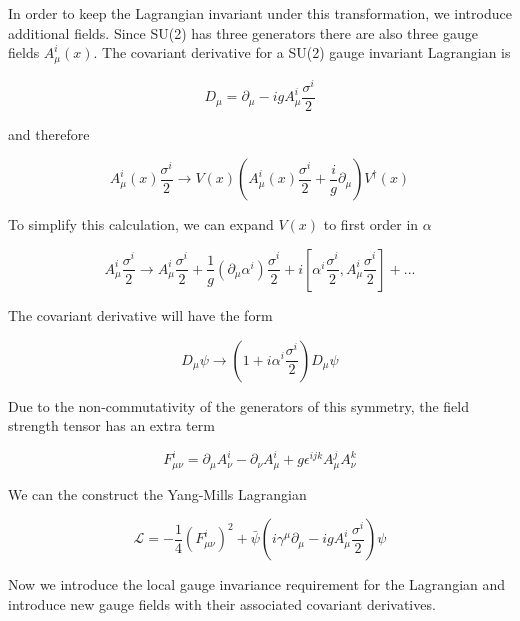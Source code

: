 In order to keep the Lagrangian invariant under this transformation, we introduce additional fields. Since SU(2) has three generators there are also three gauge fields $A_{\mu}^{i}(x)$. The covariant derivative for a SU(2) gauge invariant Lagrangian is

\begin{equation}
\label{su2cod}
D_{\mu} = \partial_{\mu} - igA_{\mu}^{i}\frac{\sigma^{i}}{2}
\end{equation}

and therefore

\begin{equation}
A_{\mu}^{i}(x)\frac{\sigma^{i}}{2}\rightarrow V(x)(A_{\mu}^{i}(x)\frac{\sigma^{i}}{2}+\frac{i}{g}\partial_{\mu})V^{\dagger}(x)
\end{equation}

To simplify this calculation, we can expand $V(x)$ to first order in $\alpha$ 

\begin{equation}
A_{\mu}^{i}\frac{\sigma^{i}}{2}\rightarrow A_{\mu}^{i}\frac{\sigma^{i}}{2} + \frac{1}{g}(\partial_{\mu}\alpha^{i})\frac{\sigma^{i}}{2} + i[\alpha^{i}\frac{\sigma^{i}}{2}, A_{\mu}^{i}\frac{\sigma^{i}}{2}] + ...
\end{equation}

The covariant derivative will have the form

\begin{equation}
D_{\mu}\psi\rightarrow(1+i\alpha^{i}\frac{\sigma^{i}}{2})D_{\mu}\psi
\end{equation}

Due to the non-commutativity of the generators of this symmetry, the field strength tensor has an extra term

\begin{equation}
F_{\mu\nu}^{i} = \partial_{\mu}A_{\nu}^{i} - \partial_{\nu}A_{\mu}^{i} + g\epsilon^{ijk}A_{\mu}^{j}A_{\nu}^{k}
\end{equation}

We can the construct the Yang-Mills Lagrangian

\begin{equation}
\mathcal{L} = -\frac{1}{4}(F_{\mu\nu}^{i})^{2}+\bar{\psi}(i\gamma^{\mu}\partial_{\mu}-igA_{\mu}^{i}\frac{\sigma^{i}}{2})\psi
\end{equation}

Now we introduce the local gauge invariance requirement for the Lagrangian and introduce new gauge fields with their associated covariant derivatives.

